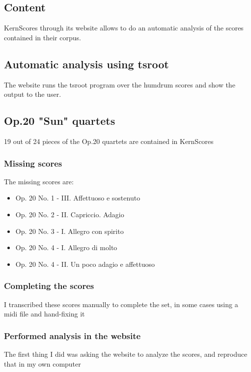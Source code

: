   \subsection{Content}
  KernScores through its website allows to do an automatic analysis of the scores contained in their corpus.
  \subsection{Automatic analysis using tsroot}
  The website runs the tsroot program over the humdrum scores and show the output to the user.
  \subsection{Op.20 "Sun" quartets}
    19 out of 24 pieces of the Op.20 quartets are contained in KernScores
    \subsubsection{Missing scores}
    The missing scores are:
    \begin{itemize}
      \item Op. 20 No. 1 - III. Affettuoso e sostenuto
      \item Op. 20 No. 2 - II. Capriccio. Adagio
      \item Op. 20 No. 3 - I. Allegro con spirito
      \item Op. 20 No. 4 - I. Allegro di molto
      \item Op. 20 No. 4 - II. Un poco adagio e affettuoso
    \end{itemize}
    \subsubsection{Completing the scores}
    I transcribed these scores manually to complete the set, in some cases using a midi file and hand-fixing it
    \subsubsection{Performed analysis in the website}
    The first thing I did was asking the website to analyze the scores, and reproduce that in my own computer


\newpage
